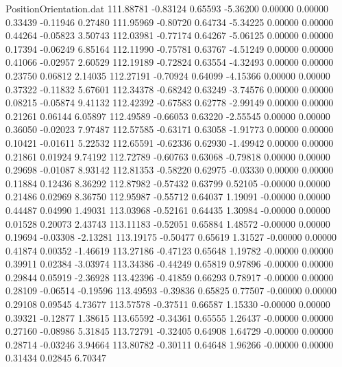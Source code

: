 \begin{filecontents}{PositionOrientation.dat}
 111.88781   -0.83124    0.65593    -5.36200    0.00000    0.00000    0.33439   -0.11946    0.27480
 111.95969   -0.80720    0.64734    -5.34225    0.00000    0.00000    0.44264   -0.05823    3.50743
 112.03981   -0.77174    0.64267    -5.06125    0.00000    0.00000    0.17394   -0.06249    6.85164
 112.11990   -0.75781    0.63767    -4.51249    0.00000    0.00000    0.41066   -0.02957    2.60529
 112.19189   -0.72824    0.63554    -4.32493    0.00000    0.00000    0.23750    0.06812    2.14035
 112.27191   -0.70924    0.64099    -4.15366    0.00000    0.00000    0.37322   -0.11832    5.67601
 112.34378   -0.68242    0.63249    -3.74576    0.00000    0.00000    0.08215   -0.05874    9.41132
 112.42392   -0.67583    0.62778    -2.99149    0.00000    0.00000    0.21261    0.06144    6.05897
 112.49589   -0.66053    0.63220    -2.55545    0.00000    0.00000    0.36050   -0.02023    7.97487
 112.57585   -0.63171    0.63058    -1.91773    0.00000    0.00000    0.10421   -0.01611    5.22532
 112.65591   -0.62336    0.62930    -1.49942    0.00000    0.00000    0.21861    0.01924    9.74192
 112.72789   -0.60763    0.63068    -0.79818    0.00000    0.00000    0.29698   -0.01087    8.93142
 112.81353   -0.58220    0.62975    -0.03330    0.00000    0.00000    0.11884    0.12436    8.36292
 112.87982   -0.57432    0.63799     0.52105   -0.00000    0.00000    0.21486    0.02969    8.36750
 112.95987   -0.55712    0.64037     1.19091   -0.00000    0.00000    0.44487    0.04990    1.49031
 113.03968   -0.52161    0.64435     1.30984   -0.00000    0.00000    0.01528    0.20073    2.43743
 113.11183   -0.52051    0.65884     1.48572   -0.00000    0.00000    0.19694   -0.03308   -2.13281
 113.19175   -0.50477    0.65619     1.31527   -0.00000    0.00000    0.41874    0.00352   -1.46619
 113.27186   -0.47123    0.65648     1.19782   -0.00000    0.00000    0.39911    0.02384   -3.03974
 113.34386   -0.44249    0.65819     0.97896   -0.00000    0.00000    0.29844    0.05919   -2.36928
 113.42396   -0.41859    0.66293     0.78917   -0.00000    0.00000    0.28109   -0.06514   -0.19596
 113.49593   -0.39836    0.65825     0.77507   -0.00000    0.00000    0.29108    0.09545    4.73677
 113.57578   -0.37511    0.66587     1.15330   -0.00000    0.00000    0.39321   -0.12877    1.38615
 113.65592   -0.34361    0.65555     1.26437   -0.00000    0.00000    0.27160   -0.08986    5.31845
 113.72791   -0.32405    0.64908     1.64729   -0.00000    0.00000    0.28714   -0.03246    3.94664
 113.80782   -0.30111    0.64648     1.96266   -0.00000    0.00000    0.31434    0.02845    6.70347

\end{filecontents}
